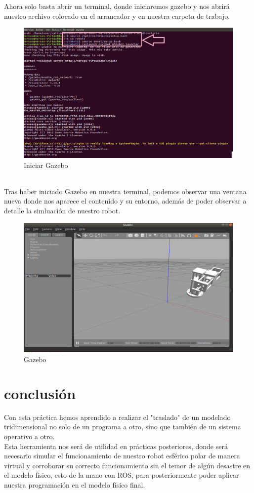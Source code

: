 \documentclass[11pt,a4paper,oldfontcommands,oneside]{memoir}
\begin{document}
Ahora solo basta abrir un terminal, donde iniciaremos gazebo y nos abrirá nuestro archivo colocado en el arrancador y en nuestra carpeta de trabajo.
\begin{figure}[h]
	\includegraphics[scale=.75]{iniciargaz.png}
	\caption{Iniciar Gazebo}
	\label{Imagen 8}
\end{figure}\\
Tras haber iniciado Gazebo en nuestra terminal, podemos observar una ventana nueva donde nos aparece el contenido y su entorno, además de poder observar a detalle la simluación de nuestro robot.
\begin{figure}[h]
	\includegraphics[scale=.75]{gaz.png}
	\caption{Gazebo}
	\label{Imagen 9}
\end{figure}
\chapter{conclusión}
Con esta práctica hemos aprendido a realizar el "traslado" de un modelado tridimensional no solo de un programa a otro, sino que también de un sistema operativo a otro.\\
Esta herramienta nos será de utilidad en prácticas posteriores, donde será necesario simular el funcionamiento de nuestro robot esférico polar de manera virtual y corroborar su correcto funcionamiento sin el temor de algún desastre en el modelo físico, esto de la mano con ROS, para posteriormente poder aplicar nuestra programación en el modelo físico final.


\hfill


\end{document}
